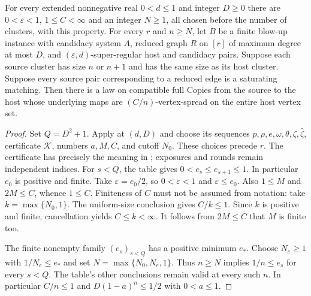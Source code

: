 \begin{lemma}
For every extended nonnegative real $0<d\leq1$ and integer $D\geq0$ there
are $0<\varepsilon<1$, $1\leq C<\infty$ and an integer $N\geq1$, all
chosen before the number of clusters, with this property. For every $r$
and $n\geq N$, let $B$ be a finite blow-up instance with candidacy system
$A$, reduced graph $R$ on $[r]$ of maximum degree at most $D$, and
$(\varepsilon,d)$-super-regular host and candidacy pairs. Suppose each
source cluster has size $n$ or $n+1$ and has the same size as its host
cluster. Suppose every source pair corresponding to a reduced edge is a
saturating matching. Then there is a law on compatible full Copies from
the source to the host whose underlying maps are $(C/n)$-vertex-spread
on the entire host vertex set.
\end{lemma}
\begin{proof}
Set $Q=D^2+1$. Apply  at $(d,D)$ and
choose its sequences $p,\rho,e,\omega,\theta,\zeta,\widehat\zeta$,
certificate $\mathcal K$, numbers $a,M,C$, and cutoff $N_0$. These choices
precede $r$. The certificate has precisely the meaning in
; exposures and rounds remain
independent indices. For $s<Q$, the table gives
$0<e_s\leq e_{s+1}\leq1$. In particular $e_0$ is positive and finite.
Take $\varepsilon=e_0/2$, so $0<\varepsilon<1$ and
$\varepsilon\leq e_0$. Also $1\leq M$ and $2M\leq C$, whence $1\leq C$.
Finiteness of $C$ must not be assumed from notation: take
$k=\max\{N_0,1\}$. The uniform-size conclusion gives $C/k\leq1$.
Since $k$ is positive and finite, cancellation yields $C\leq k<\infty$.
It follows from $2M\leq C$ that $M$ is finite too.

The finite nonempty family $(e_s)_{s<Q}$ has a positive minimum $e_*$.
Choose $N_e\geq1$ with $1/N_e\leq e_*$ and set
$N=\max\{N_0,N_e,1\}$. Thus $n\geq N$ implies
$1/n\leq e_s$ for every $s<Q$. The table's other conclusions remain
valid at every such $n$. In particular $C/n\leq1$ and
$D(1-a)^n\leq1/2$ with $0<a\leq1$.


\end{proof}

